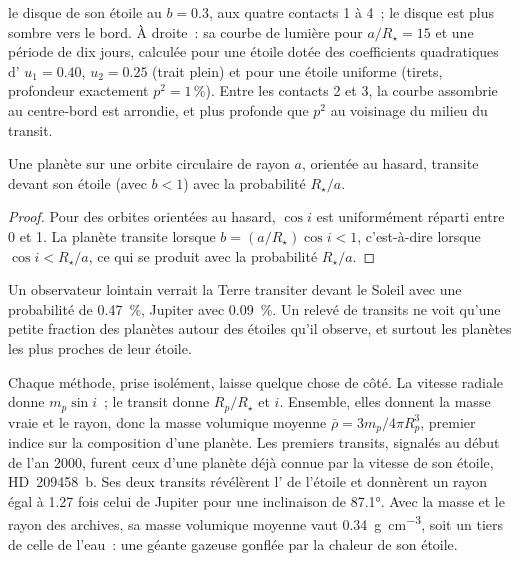 \begin{omfigure}
{le disque de son étoile au  $b = 0.3$, aux quatre
contacts 1 à 4~; le disque est plus sombre vers le bord. À droite~: sa
courbe de lumière pour $a/R_\star = 15$ et une période de dix jours, calculée pour une étoile
dotée des coefficients quadratiques d' $u_1 = 0.40$, $u_2 = 0.25$
(trait plein) et pour une étoile uniforme (tirets, profondeur exactement $p^2 = 1\,\%$).
Entre les contacts 2 et 3, la courbe assombrie au centre-bord est arrondie, et plus profonde
que $p^2$ au voisinage du milieu du transit.}\label{fig:b3:exoplanets:transit}
\end{omfigure}

\begin{proposition}\label{prop:b3:exoplanets:probability}
Une planète sur une orbite circulaire de rayon $a$, orientée au hasard, transite
devant son étoile (avec $b < 1$) avec la probabilité $R_\star/a$.
\end{proposition}

\begin{proof}
Pour des orbites orientées au hasard, $\cos i$ est uniformément réparti
entre 0 et 1. La planète transite lorsque $b = (a/R_\star)\cos i < 1$, c'est-à-dire
lorsque $\cos i < R_\star/a$, ce qui se produit avec la probabilité $R_\star/a$.
\end{proof}

Un observateur lointain verrait la Terre transiter devant le Soleil avec une probabilité
de \qty{0.47}{\percent}, Jupiter avec \qty{0.09}{\percent}. Un relevé de transits
ne voit qu'une petite fraction des planètes autour des étoiles qu'il observe,
et surtout les planètes les plus proches de leur étoile.

Chaque méthode, prise isolément, laisse quelque chose de côté. La vitesse radiale donne
$m_p\sin i$~; le transit donne $R_p/R_\star$ et $i$. Ensemble, elles donnent
la masse vraie et le rayon, donc la masse volumique moyenne
$\bar\rho = 3m_p/4\pi R_p^3$, premier indice sur la composition d'une planète.
Les premiers transits, signalés au début de l'an 2000, furent ceux d'une planète
déjà connue par la vitesse de son étoile, HD~209458~b. Ses deux transits
révélèrent l' de l'étoile et donnèrent un rayon égal à 1.27 fois celui de Jupiter pour une inclinaison de
\ang{87.1}. Avec la masse et le rayon des archives, sa masse volumique moyenne vaut
\qty{0.34}{g.cm^{-3}}, soit un tiers de celle de l'eau~: une géante gazeuse gonflée par
la chaleur de son étoile.

